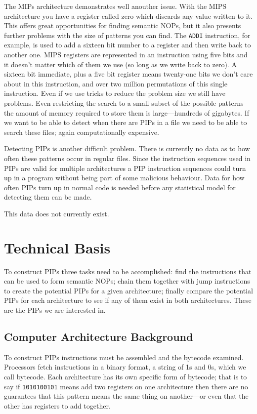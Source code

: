 \documentclass[10pt,]{book}
\begin{document}
The MIPs architecture demonstrates well anouther issue. With the MIPS
architecture you have a register called zero which discards any value
written to it. This offers great opportunities for finding semantic
NOPs, but it also presents further problems with the size of patterns
you can find. The \lstinline!ADDI! instruction, for example, is used to
add a sixteen bit number to a register and then write back to another
one. MIPS registers are represented in an instruction using five bits
and it doesn't matter which of them we use (so long as we write back to
zero). A sixteen bit immediate, plus a five bit register means
twenty-one bits we don't care about in this instruction, and over two
million permutations of this single instruction. Even if we use tricks
to reduce the problem size we still have problems. Even restricting the
search to a small subset of the possible patterns the amount of memory
required to store them is large---hundreds of gigabytes. If we want to
be able to detect when there are PIPs in a file we need to be able to
search these files; again computationally expensive.

Detecting PIPs is another difficult problem. There is currently no data
as to how often these patterns occur in regular files. Since the
instruction sequences used in PIPs are valid for multiple architectures
a PIP instruction sequences could turn up in a program without being
part of some malicious behaviour. Data for how often PIPs turn up in
normal code is needed before any statistical model for detecting them
can be made.

This data does not currently exist.

\chapter{Technical Basis}

To construct PIPs three tasks need to be accomplished: find the
instructions that can be used to form semantic NOPs; chain them together
with jump instructions to create the potential PIPs for a given
architecture; finally compare the potential PIPs for each architecture
to see if any of them exist in both architectures. These are the PIPs we
are interested in.

\section{Computer Architecture Background}

To construct PIPs instructions must be assembled and the bytecode
examined. Processors fetch instructions in a binary format, a string of
1s and 0s, which we call bytecode. Each architecture has its own
specific form of bytecode; that is to say if \lstinline!1010100101!
means add two registers on one architecture then there are no guarantees
that this pattern means the same thing on another---or even that the
other has registers to add together.
\end{document}

